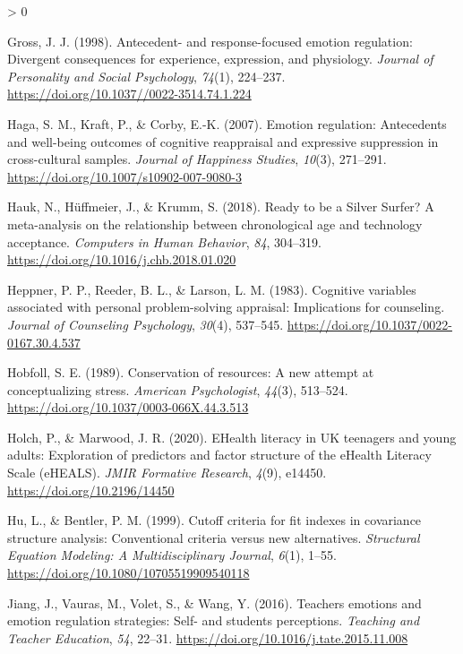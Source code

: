 \documentclass[
  english,
  man,floatsintext]{apa6}
\newlength{\cslhangindent}
\newenvironment{CSLReferences}[2] %
 {%
  \setlength{\parindent}{0pt}
  \ifodd #1 \everypar{\setlength{\hangindent}{\cslhangindent}}\ignorespaces\fi
  \ifnum #2 > 0
  \setlength{\parskip}{#2\baselineskip}
  \fi
 }%
 {}
\begin{document}
\begin{CSLReferences}{1}{0}
\leavevmode\hypertarget{ref-Gross1998a}{}%
Gross, J. J. (1998). Antecedent- and response-focused emotion regulation: {Divergent} consequences for experience, expression, and physiology. \emph{Journal of Personality and Social Psychology}, \emph{74}(1), 224--237. \url{https://doi.org/10.1037//0022-3514.74.1.224}

\leavevmode\hypertarget{ref-Haga2007}{}%
Haga, S. M., Kraft, P., \& Corby, E.-K. (2007). Emotion regulation: Antecedents and well-being outcomes of cognitive reappraisal and expressive suppression in cross-cultural samples. \emph{Journal of Happiness Studies}, \emph{10}(3), 271--291. \url{https://doi.org/10.1007/s10902-007-9080-3}

\leavevmode\hypertarget{ref-Hauk2018}{}%
Hauk, N., Hüffmeier, J., \& Krumm, S. (2018). Ready to be a {Silver Surfer}? {A} meta-analysis on the relationship between chronological age and technology acceptance. \emph{Computers in Human Behavior}, \emph{84}, 304--319. \url{https://doi.org/10.1016/j.chb.2018.01.020}

\leavevmode\hypertarget{ref-Heppner1983}{}%
Heppner, P. P., Reeder, B. L., \& Larson, L. M. (1983). Cognitive variables associated with personal problem-solving appraisal: {Implications} for counseling. \emph{Journal of Counseling Psychology}, \emph{30}(4), 537--545. \url{https://doi.org/10.1037/0022-0167.30.4.537}

\leavevmode\hypertarget{ref-Hobfoll1989}{}%
Hobfoll, S. E. (1989). Conservation of resources: {A} new attempt at conceptualizing stress. \emph{American Psychologist}, \emph{44}(3), 513--524. \url{https://doi.org/10.1037/0003-066X.44.3.513}

\leavevmode\hypertarget{ref-Holch2020}{}%
Holch, P., \& Marwood, J. R. (2020). {EHealth} literacy in {UK} teenagers and young adults: {Exploration} of predictors and factor structure of the {eHealth} {Literacy} {Scale} ({eHEALS}). \emph{JMIR Formative Research}, \emph{4}(9), e14450. \url{https://doi.org/10.2196/14450}

\leavevmode\hypertarget{ref-Hu1999}{}%
Hu, L., \& Bentler, P. M. (1999). Cutoff criteria for fit indexes in covariance structure analysis: {Conventional} criteria versus new alternatives. \emph{Structural Equation Modeling: A Multidisciplinary Journal}, \emph{6}(1), 1--55. \url{https://doi.org/10.1080/10705519909540118}

\leavevmode\hypertarget{ref-Jiang2016}{}%
Jiang, J., Vauras, M., Volet, S., \& Wang, Y. (2016). Teachers{{}} emotions and emotion regulation strategies: Self- and students{{}} perceptions. \emph{Teaching and Teacher Education}, \emph{54}, 22--31. \url{https://doi.org/10.1016/j.tate.2015.11.008}


\end{CSLReferences}
\end{document}
